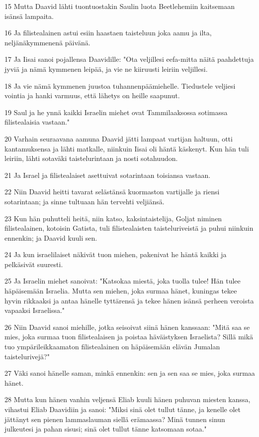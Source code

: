 \par 15 Mutta Daavid lähti tuontuostakin Saulin luota Beetlehemiin kaitsemaan isänsä lampaita.
\par 16 Ja filistealainen astui esiin haastaen taisteluun joka aamu ja ilta, neljänäkymmenenä päivänä.
\par 17 Ja Iisai sanoi pojallensa Daavidille: "Ota veljillesi eefa-mitta näitä paahdettuja jyviä ja nämä kymmenen leipää, ja vie ne kiiruusti leiriin veljillesi.
\par 18 Ja vie nämä kymmenen juustoa tuhannenpäämiehelle. Tiedustele veljiesi vointia ja hanki varmuus, että lähetys on heille saapunut.
\par 19 Saul ja he ynnä kaikki Israelin miehet ovat Tammilaaksossa sotimassa filistealaisia vastaan."
\par 20 Varhain seuraavana aamuna Daavid jätti lampaat vartijan haltuun, otti kantamuksensa ja lähti matkalle, niinkuin Iisai oli häntä käskenyt. Kun hän tuli leiriin, lähti sotaväki taistelurintaan ja nosti sotahuudon.
\par 21 Ja Israel ja filistealaiset asettuivat sotarintaan toisiansa vastaan.
\par 22 Niin Daavid heitti tavarat selästänsä kuormaston vartijalle ja riensi sotarintaan; ja sinne tultuaan hän tervehti veljiänsä.
\par 23 Kun hän puhutteli heitä, niin katso, kaksintaistelija, Goljat niminen filistealainen, kotoisin Gatista, tuli filistealaisten taisteluriveistä ja puhui niinkuin ennenkin; ja Daavid kuuli sen.
\par 24 Ja kun israelilaiset näkivät tuon miehen, pakenivat he häntä kaikki ja pelkäsivät suuresti.
\par 25 Ja Israelin miehet sanoivat: "Katsokaa miestä, joka tuolla tulee! Hän tulee häpäisemään Israelia. Mutta sen miehen, joka surmaa hänet, kuningas tekee hyvin rikkaaksi ja antaa hänelle tyttärensä ja tekee hänen isänsä perheen veroista vapaaksi Israelissa."
\par 26 Niin Daavid sanoi miehille, jotka seisoivat siinä hänen kanssaan: "Mitä saa se mies, joka surmaa tuon filistealaisen ja poistaa häväistyksen Israelista? Sillä mikä tuo ympärileikkaamaton filistealainen on häpäisemään elävän Jumalan taistelurivejä?"
\par 27 Väki sanoi hänelle saman, minkä ennenkin: sen ja sen saa se mies, joka surmaa hänet.
\par 28 Mutta kun hänen vanhin veljensä Eliab kuuli hänen puhuvan miesten kanssa, vihastui Eliab Daavidiin ja sanoi: "Miksi sinä olet tullut tänne, ja kenelle olet jättänyt sen pienen lammaslauman siellä erämaassa? Minä tunnen sinun julkeutesi ja pahan sisusi; sinä olet tullut tänne katsomaan sotaa."
